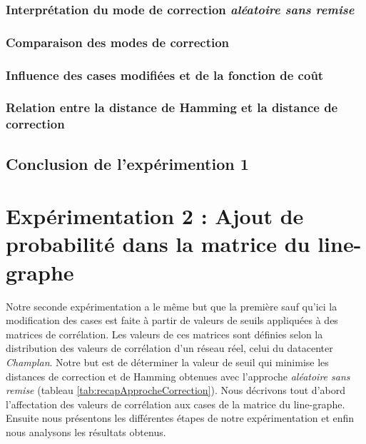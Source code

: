 		\subsubsection{Interpr\'etation du mode de correction {\em al\'eatoire sans remise}}
			\label{experimentation1InterpretationModeAleatoireSansRemise}
			
		\subsubsection{Comparaison des modes de correction}
			
		\subsubsection{Influence des cases modifi\'ees et de la fonction de co\^ut}
			\label{influenceFonctionCoutDistributionHamming1}
			
		\subsubsection{Relation entre la distance de Hamming et la distance de correction}
			
	\subsection{Conclusion de l'exp\'erimention 1}	
		

\section{Exp\'erimentation 2 : Ajout de probabilit\'e dans la matrice du line-graphe}

Notre seconde exp\'erimentation a le m\^eme but que la premi\`ere sauf qu'ici la modification des cases est faite \`a partir de valeurs de seuils appliqu\'ees \`a des matrices de corr\'elation. Les valeurs de ces matrices sont d\'efinies selon la distribution des valeurs de corr\'elation d'un r\'eseau r\'eel, celui du datacenter {\em Champlan}.
\newline
Notre but est de d\'eterminer la valeur de seuil qui minimise les distances de correction et de Hamming obtenues avec l'approche {\em al\'eatoire sans remise} (tableau \ref{tab:recapApprocheCorrection}). 
\newline
Nous d\'ecrivons tout d'abord l'affectation des valeurs de corr\'elation aux cases de la matrice du line-graphe. Ensuite nous pr\'esentons les diff\'erentes \'etapes de notre exp\'erimentation et enfin nous analysons les r\'esultats obtenus.

